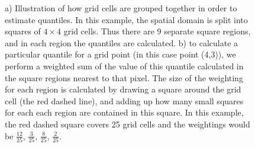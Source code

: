 \documentclass[../main.tex]{subfiles}
\begin{document}
\begin{figure}[h]
      \caption{a) Illustration of how grid cells are grouped together in order to estimate quantiles. In this example, the spatial domain is split into squares of $4 \times 4$ grid cells. Thus there are 9 separate square regions, and in each region the quantiles are calculated. b) to calculate a particular quantile for a grid point (in this case point (4,3)), we perform a weighted sum of the value of this quantile calculated in the square regions nearest to that pixel. The size of the weighting for each region is calculated by drawing a square around the grid cell (the red dashed line), and adding up how many small squares for each each region are contained in this square. In this example, the red dashed square covers 25 grid cells and the weightings would be $\frac{12}{25}$, $\frac{3}{25}$, $\frac{8}{25}$, $\frac{2}{25}$.}
     \label{fig:quantiles}
\end{figure}    
\end{document}
